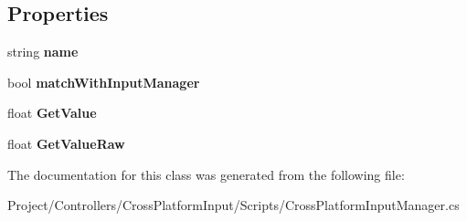 \subsection*{Properties}
\begin{DoxyCompactItemize}
\item 
\mbox{\label{class_unity_standard_assets_1_1_cross_platform_input_1_1_cross_platform_input_manager_1_1_virtual_axis_a176a271ea7cb1d9b52194ac0894c1b7b}} 
string {\bfseries name}
\item 
\mbox{\label{class_unity_standard_assets_1_1_cross_platform_input_1_1_cross_platform_input_manager_1_1_virtual_axis_a0a36c8bbe98e6f8d28c92e3e259019c6}} 
bool {\bfseries match\+With\+Input\+Manager}
\item 
\mbox{\label{class_unity_standard_assets_1_1_cross_platform_input_1_1_cross_platform_input_manager_1_1_virtual_axis_a51bd6f837943d701ba4da4048873e88d}} 
float {\bfseries Get\+Value}
\item 
\mbox{\label{class_unity_standard_assets_1_1_cross_platform_input_1_1_cross_platform_input_manager_1_1_virtual_axis_a8a528d70054dedde487f12a2a8817bab}} 
float {\bfseries Get\+Value\+Raw}
\end{DoxyCompactItemize}


The documentation for this class was generated from the following file\+:\begin{DoxyCompactItemize}
\item 
Project/\+Controllers/\+Cross\+Platform\+Input/\+Scripts/Cross\+Platform\+Input\+Manager.\+cs\end{DoxyCompactItemize}
